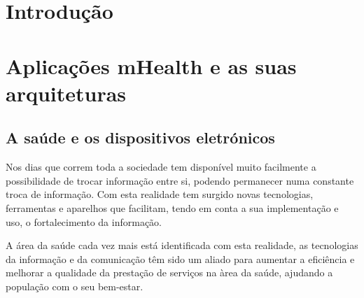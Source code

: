 \documentclass[11pt,twoside,a4paper]{report}
\begin{document}

\cleardoublepage
{}

\chapter{Introdu\c c\~ao}




\cleardoublepage

\chapter{Aplica\c c\~oes mHealth e as suas arquiteturas}

\section{A sa\'ude e os dispositivos eletr\'onicos}

Nos dias que correm toda a sociedade tem dispon\'ivel muito facilmente a possibilidade de trocar informa\c c\~ao entre si, podendo permanecer numa constante troca de informa\c c\~ao.  Com esta realidade tem surgido novas tecnologias, ferramentas e aparelhos que facilitam, tendo em conta a sua implementa\c c\~ao e uso, o fortalecimento da informa\c c\~ao. 
\par
A \'area da sa\'ude cada vez mais est\'a identificada com esta realidade, as tecnologias da informa\c c\~ao e da comunica\c c\~ao t\^em sido um aliado para aumentar a efici\^encia e melhorar a qualidade da presta\c c\~ao de servi\c cos na \`area da sa\'ude, ajudando a popula\c c\~ao com o seu bem-estar. 
\end{document}
